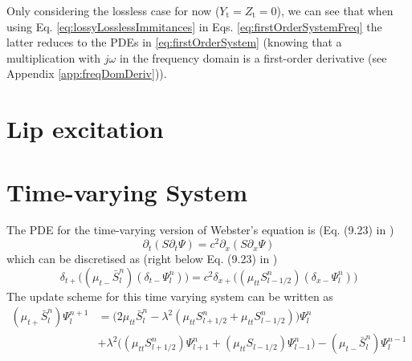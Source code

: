 \documentclass[dvipsnames]{article}
\def\dxp{\delta_{x+}}
\def\dxm{\delta_{x-}}
\def\Sp{S_{l+1/2}}
\def\Sm{S_{l-1/2}}
\def\Psilp{\Psi_{l+1}^n}
\def\Psilm{\Psi_{l-1}^n}
\def\Psinp{\Psi_l^{n+1}}
\def\Psinm{\Psi_l^{n-1}}
\def\Psiln{\Psi_l^n}
\def\muTT{\mu_{tt}}
\begin{document}
Only considering the lossless case for now ($Y_\text{t} = Z_\text{t} = 0$), we can see that when using Eq. \eqref{eq:lossyLosslessImmitances} in Eqs. \eqref{eq:firstOrderSystemFreq} the latter reduces to the PDEs in \eqref{eq:firstOrderSystem} (knowing that a multiplication with $j\omega$ in the frequency domain is a first-order derivative (see Appendix \ref{app:freqDomDeriv})).

\section{Lip excitation}

\section{Time-varying System}
The PDE for the time-varying version of Webster's equation is (Eq. (9.23) in \cite{Bilbao2009})
\begin{equation}
     \partial_t(S\partial_t\Psi) = c^2 \partial_x(S\partial_x\Psi)
\end{equation}
which can be discretised as (right below Eq. (9.23) in \cite{Bilbao2009})
\begin{equation}
    \delta_{t+}\big((\mu_{t-}\bar S_l^n)(\delta_{t-}\Psiln)\big) = c^2\dxp\big((\muTT \Sm^n)(\dxm\Psiln)\big)
\end{equation}
The update scheme for this time varying system can be written as
\begin{equation}
    \begin{aligned}
        (\mu_{t+}\bar S_l^n)\Psinp &= \Big(2 \mu_{tt}\bar S_l^n -  \lambda^2(\muTT \Sp^n + \muTT \Sm^n)\Big) \Psiln \\
        &+ \lambda^2 \Big((\muTT \Sp^n)\Psilp + (\muTT\Sm)\Psilm\Big) - (\mu_{t-}\bar S_l^n)\Psinm
    \end{aligned}
\end{equation}
\end{document}
